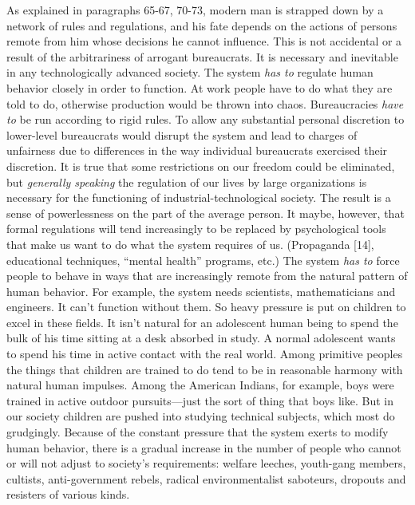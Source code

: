  As explained in paragraphs 65-67, 70-73, modern man is strap\-ped down by a network of rules and regulations, and his fate depends on the actions of persons remote from him whose decisions he cannot influence. This is not accidental or a result of the arbitrariness of arrogant bureaucrats. It is necessary and inevitable in any technologically advanced society. The system {\em has to} regulate human behavior closely in order to function. At work people have to do what they are told to do, otherwise production would be thrown into chaos. Bureaucracies {\em have to} be run according to rigid rules. To allow any substantial personal discretion to lower-level bureaucrats would disrupt the system and lead to charges of unfairness due to differences in the way individual bureaucrats exercised their discretion. It is true that some restrictions on our freedom could be eliminated, but {\em generally speaking} the regulation of our lives by large organizations is necessary for the functioning of industrial-technological society. The result is a sense of powerlessness on the part of the average person. It may\break be, however, that formal regulations will tend increasingly to be replaced by psychological tools that make us want to do what the system requires of us. (Propaganda [14], educational techniques, “mental health” programs, etc.)
 The system {\em has to} force people to behave in ways that are increasingly remote from the natural pattern of human behavior. For example, the system needs scientists, mathematicians and engineers. It can’t function without them. So heavy pressure is put on children to excel in these fields. It isn’t natural for an adolescent human being to spend the bulk of his time sitting at a desk absorbed in study. A normal adolescent wants to spend his time in active contact with the real world. Among primitive peoples the things that children are trained to do tend to be in reasonable harmony with natural human impulses. Among the American Indians, for example, boys were trained in active outdoor pursuits—just the sort of thing that boys like. But in our society children are pushed into studying technical subjects, which most do grudgingly.
 Because of the constant pressure that the system exerts to modify human behavior, there is a gradual increase in the number of people who cannot or will not adjust to society’s requirements: welfare leeches, youth-gang members, cultists, anti-government rebels, radical environmentalist saboteurs, dropouts and resisters of various kinds.
